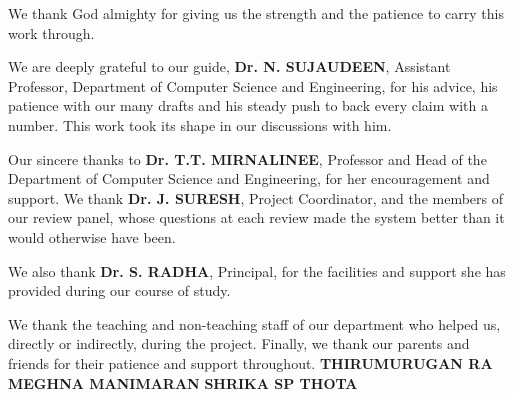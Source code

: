 \documentclass[a4paper, 14pt, oneside]{Thesis}
\begin{document}
\begin{acknowledgements}
We thank God almighty for giving us the strength and the patience to carry this work through.

We are deeply grateful to our guide, \textbf{Dr. N. SUJAUDEEN}, Assistant Professor, Department of Computer Science and Engineering, for his advice, his patience with our many drafts and his steady push to back every claim with a number. This work took its shape in our discussions with him.

Our sincere thanks to \textbf{Dr. T.T. MIRNALINEE}, Professor and Head of the Department of Computer Science and Engineering, for her encouragement and support. We thank \textbf{Dr. J. SURESH}, Project Coordinator, and the members of our review panel, whose questions at each review made the system better than it would otherwise have been.

We also thank \textbf{Dr. S. RADHA}, Principal, for the facilities and support she has provided during our course of study.

We thank the teaching and non-teaching staff of our department who helped us, directly or indirectly, during the project. Finally, we thank our parents and friends for their patience and support throughout.
\newline
\newline
\newline
\newline
{\bf THIRUMURUGAN RA}\hfill
{\bf MEGHNA MANIMARAN}\hfill
{\bf SHRIKA SP THOTA}
\end{acknowledgements}
\clearpage

\end{document}
